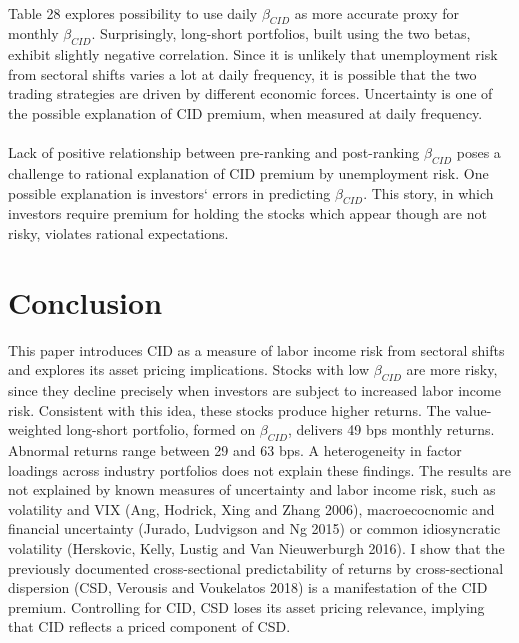 \documentclass[12pt]{article}
\begin{document}
\paragraph{}
Table 28 explores possibility to use daily $\beta_{CID}$ as more accurate proxy for monthly $\beta_{CID}$. Surprisingly, long-short portfolios, built using the two betas, exhibit slightly negative correlation. Since it is unlikely that unemployment risk from sectoral shifts varies a lot at daily frequency, it is possible that the two trading strategies are driven by different economic forces. Uncertainty is one of the possible explanation of CID premium, when measured at daily frequency.
\paragraph{}
Lack of positive relationship between pre-ranking and post-ranking $\beta_{CID}$ poses a challenge to rational explanation of CID premium by unemployment risk. One possible explanation is investors` errors in predicting $\beta_{CID}$. This story, in which investors require premium for holding the stocks which appear though are not risky, violates rational expectations. 

\vspace{1cm}

\section{Conclusion} \label{sec:Model}

This paper introduces CID as a measure of labor income risk from sectoral shifts and explores its asset pricing implications. Stocks with low $\beta_{CID}$ are more risky, since they decline precisely when investors are subject to increased labor income risk. Consistent with this idea, these stocks produce higher returns. The value-weighted long-short portfolio, formed on $\beta_{CID}$, delivers 49 bps monthly returns. Abnormal returns range between 29 and 63 bps. A heterogeneity in factor loadings across industry portfolios does not explain these findings. The results are not explained by known measures of uncertainty and labor income risk, such as volatility and VIX (Ang, Hodrick, Xing and Zhang 2006), macroecocnomic and financial uncertainty (Jurado, Ludvigson and Ng 2015) or common idiosyncratic volatility (Herskovic, Kelly, Lustig and Van Nieuwerburgh 2016). I show that the previously documented cross-sectional predictability of returns by cross-sectional dispersion (CSD, Verousis and Voukelatos 2018) is a manifestation of the CID premium. Controlling for CID, CSD loses its asset pricing relevance, implying that CID reflects a priced component of CSD.
\end{document}

